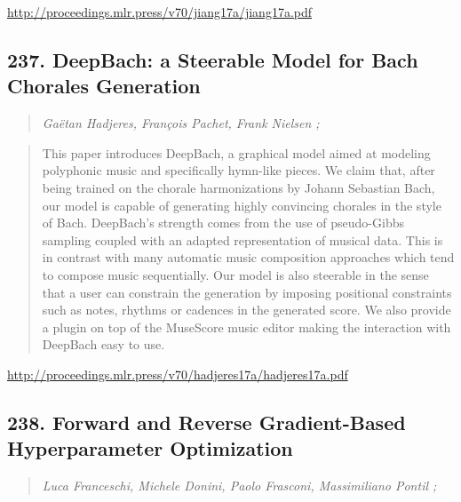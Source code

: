 \documentclass{article}
\begin{document}
\href{http://proceedings.mlr.press/v70/jiang17a/jiang17a.pdf}{http://proceedings.mlr.press/v70/jiang17a/jiang17a.pdf}

\subsection{237. DeepBach: a Steerable Model for Bach Chorales Generation}

\begin{quote}
\footnotesize{\textit{Gaëtan Hadjeres, François Pachet, Frank Nielsen ;}}
\end{quote}

\begin{quote}
    This paper introduces DeepBach, a graphical model aimed at modeling polyphonic music and specifically hymn-like pieces. We claim that, after being trained on the chorale harmonizations by Johann Sebastian Bach, our model is capable of generating highly convincing chorales in the style of Bach. DeepBach’s strength comes from the use of pseudo-Gibbs sampling coupled with an adapted representation of musical data. This is in contrast with many automatic music composition approaches which tend to compose music sequentially. Our model is also steerable in the sense that a user can constrain the generation by imposing positional constraints such as notes, rhythms or cadences in the generated score. We also provide a plugin on top of the MuseScore music editor making the interaction with DeepBach easy to use.  \end{quote}

\href{http://proceedings.mlr.press/v70/hadjeres17a/hadjeres17a.pdf}{http://proceedings.mlr.press/v70/hadjeres17a/hadjeres17a.pdf}

\subsection{238. Forward and Reverse Gradient-Based Hyperparameter Optimization}

\begin{quote}
\footnotesize{\textit{Luca Franceschi, Michele Donini, Paolo Frasconi, Massimiliano Pontil ;}}
\end{quote}
\end{document}
